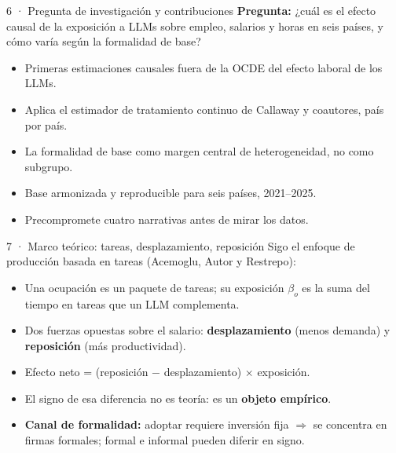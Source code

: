 \documentclass[11pt,aspectratio=169]{beamer}
\begin{document}
\begin{frame}{6 · Pregunta de investigación y contribuciones}
\textbf{Pregunta:} ¿cuál es el efecto causal de la exposición a LLMs sobre empleo, salarios y horas en seis países, y cómo varía según la formalidad de base?
\begin{itemize}
  \item Primeras estimaciones causales fuera de la OCDE del efecto laboral de los LLMs.
  \item Aplica el estimador de tratamiento continuo de Callaway y coautores, país por país.
  \item La formalidad de base como margen central de heterogeneidad, no como subgrupo.
  \item Base armonizada y reproducible para seis países, 2021--2025.
  \item Precompromete cuatro narrativas antes de mirar los datos.
\end{itemize}
\end{frame}

\begin{frame}{7 · Marco teórico: tareas, desplazamiento, reposición}
Sigo el enfoque de producción basada en tareas (Acemoglu, Autor y Restrepo):
\begin{itemize}
  \item Una ocupación es un paquete de tareas; su exposición $\beta_o$ es la suma del tiempo en tareas que un LLM complementa.
  \item Dos fuerzas opuestas sobre el salario: \textbf{desplazamiento} (menos demanda) y \textbf{reposición} (más productividad).
  \item Efecto neto = (reposición $-$ desplazamiento) $\times$ exposición.
  \item El signo de esa diferencia no es teoría: es un \textbf{objeto empírico}.
  \item \textbf{Canal de formalidad:} adoptar requiere inversión fija $\Rightarrow$ se concentra en firmas formales; formal e informal pueden diferir en signo.
\end{itemize}
\end{frame}
\end{document}
